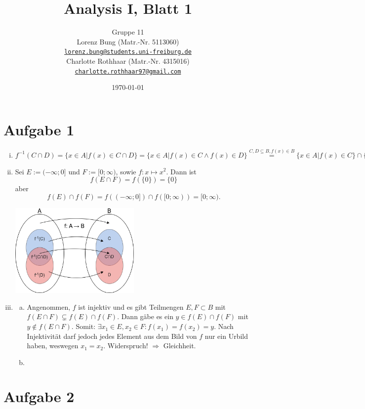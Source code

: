 \documentclass[12pt,a4paper]{article}
\title{Analysis I, Blatt 1}
\author{
    Gruppe 11\\
    Lorenz Bung (Matr.-Nr. 5113060)\\
    \href{mailto:lorenz.bung@students.uni-freiburg.de}{\texttt{lorenz.bung@students.uni-freiburg.de}}\\
    Charlotte Rothhaar (Matr.-Nr. 4315016)\\
    \href{mailto:charlotte.rothhaar97@gmail.com}{\texttt{charlotte.rothhaar97@gmail.com}}
}
\date{\today}
\begin{document}
\maketitle


\section*{Aufgabe 1}

\begin{enumerate}[(i)]
    \item $f^{-1}(C \cap D) = \{x \in A | f(x) \in C \cap D\} = \{x \in A | f(x) \in C \wedge f(x) \in D\} \overset{C,D \subseteq B, f(x) \in B}{=} \{x \in A | f(x) \in C\} \cap \{x \in A | f(x) \in D\} = f^{-1}(C) \cap f^{-1}(D).$ %
    \item Sei $E := (- \infty; 0]$ und $F := [0; \infty)$, sowie $f: x \mapsto x^2$. Dann ist $$f(E \cap F) = f(\{0\}) = \{0\}$$ aber $$f(E) \cap f(F) = f((- \infty; 0]) \cap f([0; \infty)) = [0; \infty).$$
    \begin{minipage}[h]{\textwidth}
        \centering
        \includegraphics[width=0.5\textwidth]{Diagramm.png}
    \end{minipage}
    \item \begin{enumerate}[(a)]
        \item Angenommen, $f$ ist injektiv und es gibt Teilmengen $E, F \subset B$ mit $f(E \cap F) \subsetneq f(E) \cap f(F)$.
        Dann gäbe es ein $y \in f(E) \cap f(F)$ mit $y \notin f(E \cap F)$.
        Somit: $\exists x_1 \in E, x_2 \in F: f(x_1) = f(x_2) = y$.
        Nach Injektivität darf jedoch jedes Element aus dem Bild von $f$ nur ein Urbild haben, weswegen $x_1 = x_2$.
        Widerspruch! $\Rightarrow$ Gleichheit.
        \item
    \end{enumerate}
\end{enumerate}


\section*{Aufgabe 2}
\end{document}
